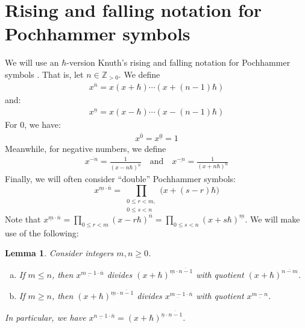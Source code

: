 \documentclass[11pt,reqno]{amsart}
\numberwithin{equation}{section}
\newtheorem{Lemma}[equation]{Lemma}
\theoremstyle{definition}
\newcommand{\ZZ}{\mathbb{Z}}
\begin{document}

\appendix

\section{Rising and falling notation for Pochhammer symbols}
\label{appendix-sec:rising-and-falling-notation-for-pochhammer-symbols}
We will use an $\hbar$-version Knuth's rising and falling notation for Pochhammer symbols \cite{ConcreteMathematics}. That is, let $n \in \ZZ_{>0}$. We define
\begin{align}
  \label{eq:2}
  x^{\overline{n}} = x (x + \hbar) \cdots (x + (n-1)\hbar)
\end{align}
and:
\begin{align}
  \label{eq:6}
  x^{\underline{n}} = x (x - \hbar) \cdots (x - (n-1)\hbar)
\end{align}
For $0$, we have:
\begin{align}
  \label{eq:7}
  x^{\overline{0}} = x^{\underline{0}} = 1
\end{align}
Meanwhile, for negative numbers, we define
\begin{align}
  \label{eq:8}
  x^{\overline{-n}} = \frac{1}{ (x-n\hbar)^{\overline{n}}}  \quad \text{and} \quad   x^{\underline{-n}} = \frac{1}{ (x+n\hbar)^{\underline{n}}}
\end{align}
Finally, we will often consider ``double'' Pochhammer symbols:
\begin{equation}
    \label{eq:doublePochh}
    x^{\underline{m}\cdot \overline{n}}  = \prod_{\substack{0 \leq r <m, \\ 0 \leq s < n}} \big(x+(s-r)\hbar\big)
\end{equation}
Note that $x^{\underline{m}\cdot \overline{n}} = \prod_{0\leq r < m}(x-r\hbar)^{\overline{n}} = \prod_{0 \leq s < n} (x+s\hbar)^{\underline{m}}$.  We will make use of the following:
\begin{Lemma}
    \label{lem:doublePochhdiv} Consider integers $m,n \geq 0$.
    \begin{enumerate}[(a)]
    \itemsep0.5em 
        \item If $m \leq n$, then $x^{\underline{m-1}\cdot \overline{n}}$ divides $(x+\hbar)^{\underline{m}\cdot \overline{n-1}}$ with quotient $(x+\hbar)^{\overline{n-m}}$.
        \item If $m\geq n$, then  $(x+\hbar)^{\underline{m}\cdot \overline{n-1}}$ divides $x^{\underline{m-1}\cdot \overline{n}}$ with quotient $x^{\underline{m-n}}$.
    \end{enumerate}
    In particular, we have $x^{\underline{n-1} \cdot \overline{n}} = (x+\hbar)^{ \underline{n}\cdot \overline{n-1}} $.
\end{Lemma}
\end{document}
